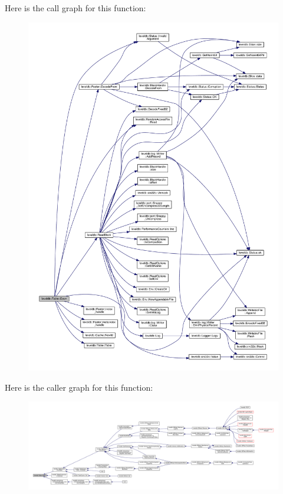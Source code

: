 Here is the call graph for this function\+:\nopagebreak
\begin{figure}[H]
\begin{center}
\leavevmode
\includegraphics[width=350pt]{classleveldb_1_1_table_aa25d0e074ab4de46e583522a8c0e9582_cgraph}
\end{center}
\end{figure}




Here is the caller graph for this function\+:
\nopagebreak
\begin{figure}[H]
\begin{center}
\leavevmode
\includegraphics[width=350pt]{classleveldb_1_1_table_aa25d0e074ab4de46e583522a8c0e9582_icgraph}
\end{center}
\end{figure}


